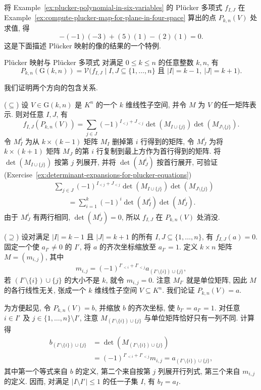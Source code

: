 将 Example~\ref{ex:plucker-polynomial-in-six-variables} 的 Plücker 多项式 $f_{I,J}$ 在 Example~\ref{ex:compute-plucker-map-for-plane-in-four-space} 算出的点 $P_{k,n}(V)$ 处求值, 得
\[
  -(-1)(-3)+(5)(1)-(2)(1)=0.
\]
这是下面描述 Plücker 映射的像的结果的一个特例.

\begin{Proposition}{Plücker 映射与 Plücker 多项式}\leavevmode\label{prop:plucker-image-defined-by-plucker-polynomials}
对满足 $0\le k\le n$ 的任意整数 $k,n$, 有
\[
  P_{k,n}(\mathrm{G}(k,n))=
  \mathcal{V}\bigl(f_{I,J}\mid I,J\subseteq\{1,\ldots,n\}
  \text{ 且 }|I|=k-1,\ |J|=k+1\bigr).
\]
\end{Proposition}
\begin{Proof}
我们证明两个方向的包含关系.

($\subseteq$) 设 $V\in\mathrm{G}(k,n)$ 是 $K^{n}$ 的一个 $k$ 维线性子空间, 并令 $M$ 为 $V$ 的任一矩阵表示. 则对任意 $I,J$, 有
\[
  f_{I,J}(P_{k,n}(V))
  =\sum_{j\in J}(-1)^{I_{<j}+J_{<j}}
      \det(M_{I\cup\{j\}})\det(M_{J\setminus\{j\}}).
\]
令 $M_{I}^{i}$ 为从 $k\times(k-1)$ 矩阵 $M_{I}$ 删掉第 $i$ 行得到的矩阵, 令 $M_{J}^{i}$ 为将 $k\times(k+1)$ 矩阵 $M_{J}$ 的第 $i$ 行复制到最上方作为首行得到的矩阵. 将 $\det(M_{I\cup\{j\}})$ 按第 $j$ 列展开, 并将 $\det(M_{J}^{i})$ 按首行展开, 可验证 (Exercise~\ref{ex:determinant-expansions-for-plucker-equations})
\[
  \begin{aligned}
  &\sum_{j\in J}(-1)^{I_{<j}+J_{<j}}\det(M_{I\cup\{j\}})\det(M_{J\setminus\{j\}})\\
  &\qquad=\sum_{i=1}^{k}(-1)^{i}\det(M_{I}^{i})\det(M_{J}^{i}).
  \end{aligned}
\]
由于 $M_{J}^{i}$ 有两行相同, $\det(M_{J}^{i})=0$, 所以 $f_{I,J}$ 在 $P_{k,n}(V)$ 处消没.

($\supseteq$) 设对满足 $|I|=k-1$ 且 $|J|=k+1$ 的所有 $I,J\subseteq\{1,\ldots,n\}$, 有 $f_{I,J}(a)=0$. 固定一个使 $a_{I'}\ne0$ 的 $I'$, 将 $a$ 的齐次坐标缩放至 $a_{I'}=1$. 定义 $k\times n$ 矩阵 $M=(m_{i,j})$, 其中
\[
  m_{i,j}=(-1)^{I'_{<i}+I'_{<j}}a_{(I'\setminus\{i\})\cup\{j\}},
\]
若 $(I'\setminus\{i\})\cup\{j\}$ 的大小不是 $k$, 就令 $m_{i,j}=0$. 注意 $M_{I'}$ 就是单位矩阵, 因此 $M$ 的各行线性无关, 张成一个 $k$ 维线性子空间 $V\subseteq K^{n}$. 我们论证 $P_{k,n}(V)=a$.

为方便起见, 令 $P_{k,n}(V)=b$, 并缩放 $b$ 的齐次坐标, 使 $b_{I'}=a_{I'}=1$. 对任意 $i\in I'$ 及 $j\in\{1,\ldots,n\}\setminus I'$, 注意 $M_{(I'\setminus\{i\})\cup\{j\}}$ 与单位矩阵恰好只有一列不同. 计算得
\[
  \begin{aligned}
  b_{(I'\setminus\{i\})\cup\{j\}}
    &=\det(M_{(I'\setminus\{i\})\cup\{j\}})\\
    &=(-1)^{I'_{<i}+I'_{<j}}m_{i,j}=a_{(I'\setminus\{i\})\cup\{j\}},
  \end{aligned}
\]
其中第一个等式来自 $b$ 的定义, 第二个来自按第 $j$ 列展开行列式, 第三个来自 $m_{i,j}$ 的定义. 因而, 对满足 $|I\setminus I'|\le1$ 的任一子集 $I$, 有 $b_{I}=a_{I}$.


\end{Proof}

